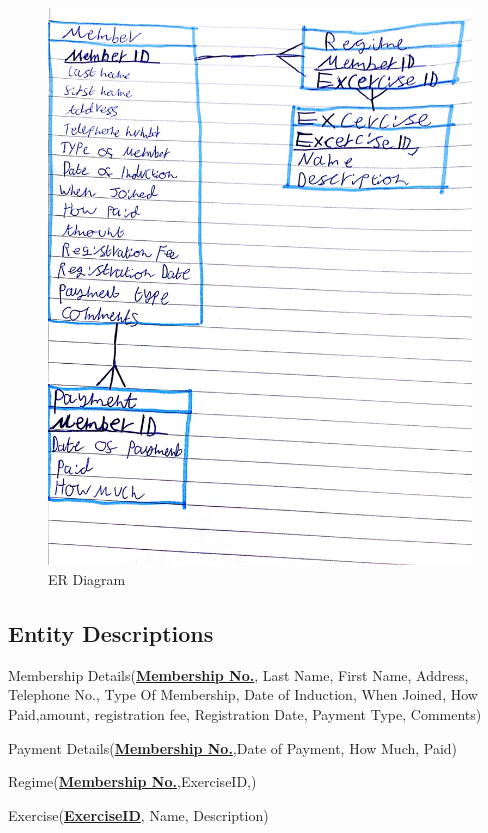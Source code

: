 \begin{figure}[H]
    \includegraphics[width=\textwidth]{-ERDiagram.jpg}
    \caption{ER Diagram} \label{fig: ER Diagram}
\end{figure}


\subsection{Entity Descriptions}

Membership Details(\textbf{\underline{Membership No.}}, Last Name, First Name, Address, Telephone No., Type Of Membership, Date of Induction, When Joined, How Paid,amount, registration fee, Registration Date, Payment Type, Comments)

Payment Details(\textbf{\underline{Membership No.}},Date of Payment, How Much, Paid)

Regime(\textbf{\underline{Membership No.}},ExerciseID,)

Exercise(\textbf{\underline{ExerciseID}}, Name, Description)

